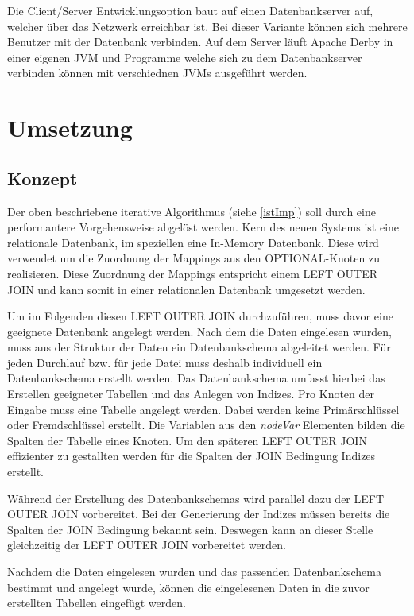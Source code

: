 \documentclass[draft,final]{vutinfth} %
\begin{document}
Die Client/Server Entwicklungsoption baut auf einen Datenbankserver auf, welcher über das Netzwerk erreichbar ist. Bei dieser Variante können sich mehrere Benutzer mit der Datenbank verbinden. Auf dem Server läuft Apache Derby in einer eigenen JVM und Programme welche sich zu dem Datenbankserver verbinden können mit verschiednen JVMs ausgeführt werden.


 
\cite{ApaDoc}

\chapter{Umsetzung}
\section{Konzept}
Der oben beschriebene iterative Algorithmus (siehe \ref{istImp}) soll durch eine performantere Vorgehensweise abgelöst werden. Kern des neuen Systems ist eine relationale Datenbank, im speziellen eine In-Memory Datenbank. Diese wird verwendet um die Zuordnung der Mappings aus den OPTIONAL-Knoten zu realisieren. Diese Zuordnung der Mappings entspricht einem LEFT OUTER JOIN und kann somit in einer relationalen Datenbank umgesetzt werden.

Um im Folgenden diesen LEFT OUTER JOIN durchzuführen, muss davor eine geeignete Datenbank angelegt werden. Nach dem die Daten eingelesen wurden, muss aus der Struktur der Daten ein Datenbankschema abgeleitet werden. Für jeden Durchlauf bzw. für jede Datei muss deshalb individuell ein Datenbankschema erstellt werden. Das Datenbankschema umfasst hierbei das Erstellen geeigneter Tabellen und das Anlegen von Indizes. Pro Knoten der Eingabe muss eine Tabelle angelegt werden. Dabei werden keine Primärschlüssel oder Fremdschlüssel erstellt. Die Variablen aus den \textit{nodeVar} Elementen bilden die Spalten der Tabelle eines Knoten. Um den späteren LEFT OUTER JOIN effizienter zu gestallten werden für die Spalten der JOIN Bedingung Indizes erstellt.

Während der Erstellung des Datenbankschemas wird parallel dazu der LEFT OUTER JOIN vorbereitet. Bei der Generierung der Indizes müssen bereits die Spalten der JOIN Bedingung bekannt sein. Deswegen kann an dieser Stelle gleichzeitig der LEFT OUTER JOIN vorbereitet werden.

Nachdem die Daten eingelesen wurden und das passenden Datenbankschema bestimmt und angelegt wurde, können die eingelesenen Daten in die zuvor erstellten Tabellen eingefügt werden. 
\end{document}
